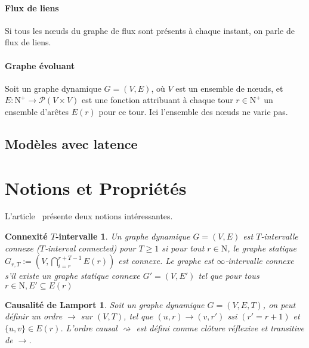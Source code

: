 \documentclass[12pt,a4paper]{article}
\begin{document}
\paragraph{Flux de liens} Si tous les nœuds du graphe de flux sont
présents à chaque instant, on parle de flux de liens.

\paragraph{Graphe évoluant}\cite{kuhn2011dynamic} Soit un graphe
dynamique \(G = (V, E)\), où \(V\) est un ensemble de nœuds, et \(E :
\mathrm{N}^{+} \to \mathcal{P}(V \times V)\) est une fonction attribuant
à chaque tour \(r \in \mathrm{N}^{+}\) un ensemble d'arêtes \(E(r)\)
pour ce tour. Ici l'ensemble des nœuds ne varie pas.

\subsection{Modèles avec latence}

\section{Notions et Propriétés}

L'article~\cite{kuhn2010distributed} présente deux notions intéressantes.

\newtheorem{t_interval_connectivity}{Connexité \(T\)‑intervalle}
\begin{t_interval_connectivity}
  Un graphe dynamique \(G = (V, E)\) est \(T\)‑intervalle connexe
  (\textit{\(T\)‑interval connected}) pour \(T \geq 1\) si pour tout
  \(r \in \mathrm{N}\), le graphe statique \(G_{r,T} := (V,
  \bigcap_{i=r}^{r+T-1} E(r))\) est connexe. Le graphe est
  \(\infty\)‑intervalle connexe s'il existe un graphe statique connexe
  \(G' = (V, E')\) tel que pour tous \(r \in \mathrm{N}, E' \subseteq E(r)\)
\end{t_interval_connectivity}

\newtheorem{lamport_causality}{Causalité de Lamport}
\begin{lamport_causality}
  Soit un graphe dynamique \(G = (V, E, T)\), on peut définir un ordre
  \(\rightarrow\) sur \((V, T)\), tel que
  \((u, r) \rightarrow (v, r')\) ssi \((r' = r + 1)\) et
  \(\{u, v\} \in E(r)\). L'\textit{ordre causal} \(\rightsquigarrow\)
  est défini comme clôture réflexive et transitive de \(\rightarrow\).
\end{lamport_causality}
\end{document}
